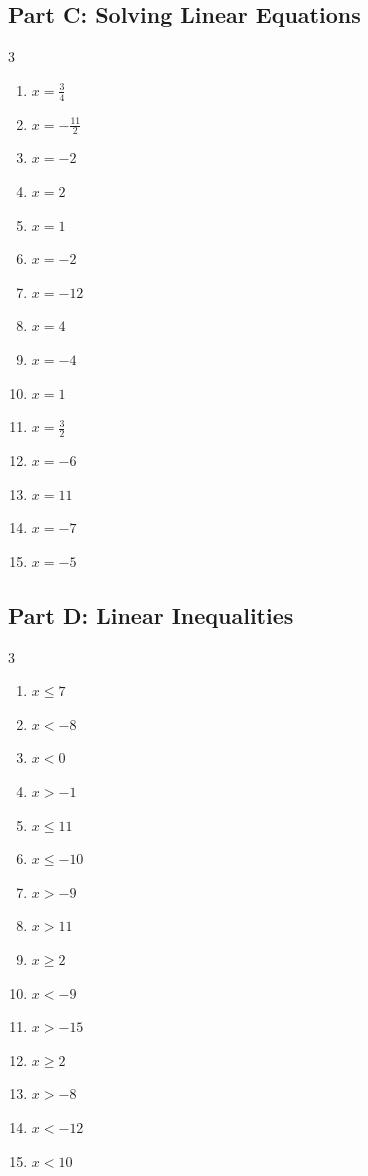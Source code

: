 \documentclass[11pt]{article}
\begin{document}
\subsection*{Part C: Solving Linear Equations}
\begin{multicols}{3}
\begin{enumerate}
  \item $x = \frac{3}{4}$
  \item $x = - \frac{11}{2}$
  \item $x = -2$
  \item $x = 2$
  \item $x = 1$
  \item $x = -2$
  \item $x = -12$
  \item $x = 4$
  \item $x = -4$
  \item $x = 1$
  \item $x = \frac{3}{2}$
  \item $x = -6$
  \item $x = 11$
  \item $x = -7$
  \item $x = -5$
\end{enumerate}
\end{multicols}
\subsection*{Part D: Linear Inequalities}
\begin{multicols}{3}
\begin{enumerate}
  \item $x \le 7$
  \item $x < -8$
  \item $x < 0$
  \item $x > -1$
  \item $x \le 11$
  \item $x \le -10$
  \item $x > -9$
  \item $x > 11$
  \item $x \ge 2$
  \item $x < -9$
  \item $x > -15$
  \item $x \ge 2$
  \item $x > -8$
  \item $x < -12$
  \item $x < 10$
\end{enumerate}
\end{multicols}
\end{document}
